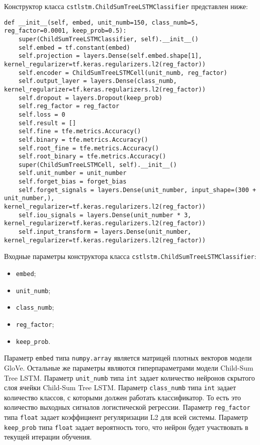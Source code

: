 Конструктор класса \texttt{cstlstm.ChildSumTreeLSTMClassifier} представлен ниже:
\medskip
\begin{lstlisting}[style=Python]
  def __init__(self, embed, unit_numb=150, class_numb=5, reg_factor=0.0001, keep_prob=0.5):
    super(ChildSumTreeLSTMClassifier, self).__init__()
    self.embed = tf.constant(embed)
    self.projection = layers.Dense(self.embed.shape[1], kernel_regularizer=tf.keras.regularizers.l2(reg_factor))
    self.encoder = ChildSumTreeLSTMCell(unit_numb, reg_factor)
    self.output_layer = layers.Dense(class_numb, kernel_regularizer=tf.keras.regularizers.l2(reg_factor))
    self.dropout = layers.Dropout(keep_prob)
    self.reg_factor = reg_factor
    self.loss = 0
    self.result = []
    self.fine = tfe.metrics.Accuracy()
    self.binary = tfe.metrics.Accuracy()
    self.root_fine = tfe.metrics.Accuracy()
    self.root_binary = tfe.metrics.Accuracy()
    super(ChildSumTreeLSTMCell, self).__init__()
    self.unit_number = unit_number
    self.forget_bias = forget_bias
    self.forget_signals = layers.Dense(unit_number, input_shape=(300 + unit_number,), kernel_regularizer=tf.keras.regularizers.l2(reg_factor))
    self.iou_signals = layers.Dense(unit_number * 3, kernel_regularizer=tf.keras.regularizers.l2(reg_factor))
    self.input_transform = layers.Dense(unit_number, kernel_regularizer=tf.keras.regularizers.l2(reg_factor))
\end{lstlisting}
\medskip

Входные параметры конструктора класса \texttt{cstlstm.ChildSumTreeLSTMClassifier}:
\begin{itemize}
\item \texttt{embed};
\item \texttt{unit\_numb};
\item \texttt{class\_numb};
\item \texttt{reg\_factor};
\item \texttt{keep\_prob}.
\end{itemize}

Параметр \texttt{embed} типа \texttt{numpy.array} является матрицей плотных векторов модели GloVe. Остальные же параметры являются гиперпараметрами модели Child-Sum Tree LSTM\@. Параметр \texttt{unit\_numb} типа \texttt{int} задает количество нейронов скрытого слоя ячейки Child-Sum Tree LSTM\@. Параметр \texttt{class\_numb} типа \texttt{int} задает количество классов, с которыми должен работать классификатор. То есть это количество выходных сигналов логистической регрессии. Параметр \texttt{reg\_factor} типа \texttt{float} задает коэффициент регуляризации L2 для всей системы. Параметр \texttt{keep\_prob} типа \texttt{float} задает вероятность того, что нейрон будет участвовать в текущей итерации обучения.

